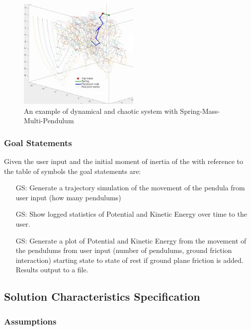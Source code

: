 \documentclass[12pt, titlepage]{article}
\newcounter{goalnum} %
\begin{document}
\begin{figure}[h]
	\centering
	\includegraphics[width=220px]{multi-pend.jpg}
	\caption{An example of dynamical and chaotic system with
	Spring-Mass-Multi-Pendulum~\citep{MLSim}}
	\label{fig:multipend}
\end{figure}

\subsubsection{Goal Statements}

\noindent Given the user input and the initial moment of inertia of 
the \progname with reference to the table of symbols the goal statements are: 

\begin{itemize}
\item[GS\refstepcounter{goalnum}\thegoalnum:] Generate a trajectory
simulation of the movement of the pendula from user input (how many pendulums) 

\item[GS\refstepcounter{goalnum}\thegoalnum:] Show logged statistics of 
Potential and Kinetic Energy over time to the user. 

\item[GS\refstepcounter{goalnum}\thegoalnum:] Generate a plot of Potential
and Kinetic Energy from the movement of the pendulums from user input 
(number of pendulums, ground friction interaction) starting state to state of rest
if ground plane friction is added. Results output to a file.
\end{itemize}

\newpage

\subsection{Solution Characteristics Specification}

\subsubsection{Assumptions}
\end{document}
